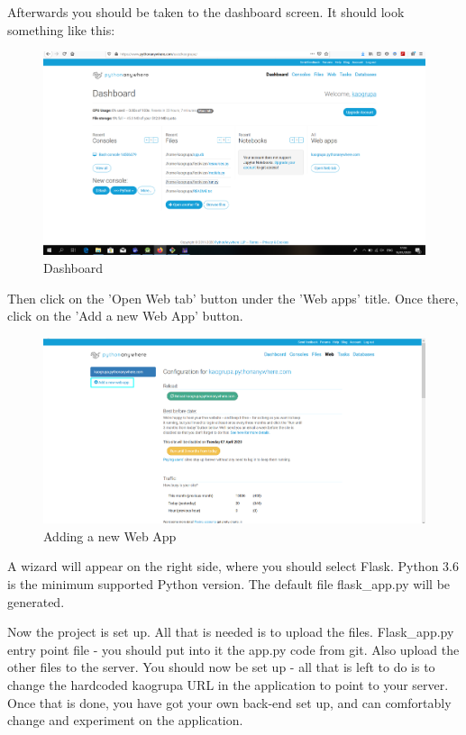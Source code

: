 				Afterwards you should be taken to the dashboard screen. It should look something like this:
				\begin{figure}[H]
					\includegraphics[width=\linewidth]{images/Deploy_2.png}
					\caption{Dashboard}
					\label{fig:deployment_2}
				\end{figure}
				
				Then click on the 'Open Web tab' button under the 'Web apps' title. Once there, click on the 'Add a new Web App' button.
				\begin{figure}[H]
					\includegraphics[width=\linewidth]{images/Deploy_3.png}
					\caption{Adding a new Web App}
					\label{fig:deployment_3}
				\end{figure}
				
				A wizard will appear on the right side, where you should select Flask. Python 3.6 is the minimum supported Python version. The default file flask\_app.py will be generated. 
				
				Now the project is set up. All that is needed is to upload the files. Flask\_app.py entry point file - you should put into it the app.py code from git. Also upload the other files to the server. You should now be set up - all that is left to do is to change the hardcoded kaogrupa URL in the application to point to your server. Once that is done, you have got your own back-end set up, and can comfortably change and experiment on the application.
				
